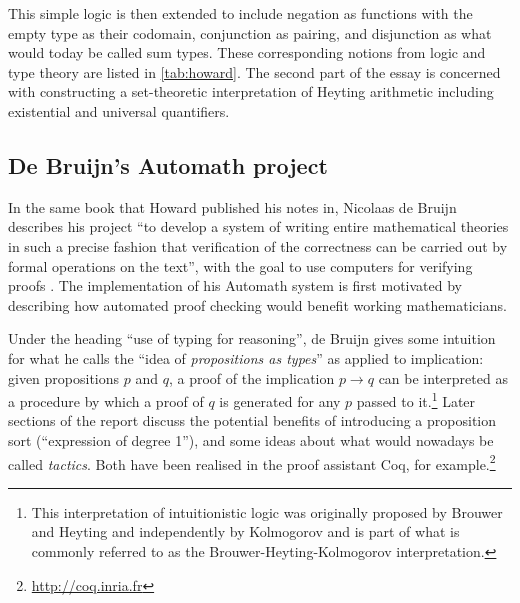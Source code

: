 \documentclass[12pt,toc=bibliography,numbers=noendperiod,
               footnotes=multiple,twoside]{scrartcl}
\begin{document}
This simple
logic is then extended to include negation as functions with the empty type as their codomain, conjunction as pairing, and disjunction as what would today be called sum types. These corresponding notions from logic and type theory are listed in \cref{tab:howard}. The second part of the essay is concerned with constructing a set-theoretic interpretation of Heyting arithmetic including existential and universal quantifiers.

\subsection{De Bruijn's Automath project}

In the same book that Howard published his notes in, Nicolaas de Bruijn describes his project \enquote{to develop a system of writing entire mathematical theories in such a precise fashion that verification of the correctness can be carried out by formal operations on the text}, with the goal to use computers for verifying proofs \autocite{de_bruijn_survey_1980}. The implementation of his Automath system is first motivated by describing how automated proof checking would benefit working mathematicians.

Under the heading \enquote{use of typing for reasoning}, de Bruijn gives some intuition for what he calls the \enquote{idea of \emph{propositions as types}} as applied to implication: given propositions \(p\) and \(q\), a proof of the implication \(p \rightarrow q\) can be interpreted as a procedure by which a proof of \(q\) is generated for any \(p\) passed to it.\footnote{This interpretation of intuitionistic logic was originally proposed by Brouwer and Heyting and independently by Kolmogorov and is part of what is commonly referred to as the Brouwer-Heyting-Kolmogorov interpretation.} Later sections of the report discuss the potential benefits of introducing a proposition sort (\enquote{expression of degree 1}), and some ideas about what would nowadays be called \emph{tactics}. Both have been realised in the proof assistant Coq, for example.\footnote{\url{http://coq.inria.fr}}
\end{document}
